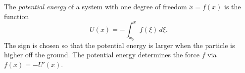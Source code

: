 The \textit{potential energy} of a system with one degree of freedom $\ddot{x} = f(x)$ is the function
$$U(x) = -\int_{x_0}^{x} f(\xi)\,d\xi.$$
The sign is chosen so that the potential energy is larger when the particle is higher off the ground.
The potential energy determines the force $f$ via $f(x) = -U'(x)$.
